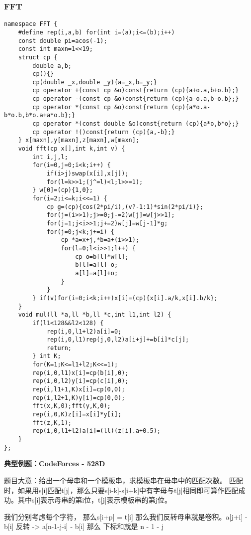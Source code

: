\subsubsection{FFT}
\begin{lstlisting}
namespace FFT {
    #define rep(i,a,b) for(int i=(a);i<=(b);i++)
    const double pi=acos(-1);
    const int maxn=1<<19;
    struct cp {
        double a,b;
        cp(){}
        cp(double _x,double _y){a=_x,b=_y;}
        cp operator +(const cp &o)const{return (cp){a+o.a,b+o.b};}
        cp operator -(const cp &o)const{return (cp){a-o.a,b-o.b};}
        cp operator *(const cp &o)const{return (cp){a*o.a-b*o.b,b*o.a+a*o.b};}
        cp operator *(const double &o)const{return (cp){a*o,b*o};}
        cp operator !()const{return (cp){a,-b};}
    } x[maxn],y[maxn],z[maxn],w[maxn];
    void fft(cp x[],int k,int v) {
        int i,j,l;
        for(i=0,j=0;i<k;i++) {
            if(i>j)swap(x[i],x[j]);
            for(l=k>>1;(j^=l)<l;l>>=1);
        } w[0]=(cp){1,0};
        for(i=2;i<=k;i<<=1) {
            cp g=(cp){cos(2*pi/i),(v?-1:1)*sin(2*pi/i)};
            for(j=(i>>1);j>=0;j-=2)w[j]=w[j>>1];
            for(j=1;j<i>>1;j+=2)w[j]=w[j-1]*g;
            for(j=0;j<k;j+=i) {
                cp *a=x+j,*b=a+(i>>1);
                for(l=0;l<i>>1;l++) {
                    cp o=b[l]*w[l];
                    b[l]=a[l]-o;
                    a[l]=a[l]+o;
                }
            }
        } if(v)for(i=0;i<k;i++)x[i]=(cp){x[i].a/k,x[i].b/k};
    }
    void mul(ll *a,ll *b,ll *c,int l1,int l2) {
        if(l1<128&&l2<128) {
            rep(i,0,l1+l2)a[i]=0;
            rep(i,0,l1)rep(j,0,l2)a[i+j]+=b[i]*c[j];
            return;
        } int K;
        for(K=1;K<=l1+l2;K<<=1);
        rep(i,0,l1)x[i]=cp(b[i],0);
        rep(i,0,l2)y[i]=cp(c[i],0);
        rep(i,l1+1,K)x[i]=cp(0,0);
        rep(i,l2+1,K)y[i]=cp(0,0);
        fft(x,K,0);fft(y,K,0);
        rep(i,0,K)z[i]=x[i]*y[i];
        fft(z,K,1);
        rep(i,0,l1+l2)a[i]=(ll)(z[i].a+0.5);
    }
};
\end{lstlisting}

{\bfseries 典型例题：CodeForces - 528D }

题目大意：给出一个母串和一个模板串，求模板串在母串中的匹配次数。 
匹配时，如果用s[i]匹配t[j]，那么只要s[i-k]-s[i+k]中有字母与t[j]相同即可算作匹配成功。其中s[i]表示母串的第i位，t[j]表示模板串的第j位。

我们分别考虑每个字符， 那么s[i+p] = t[i] 那么我们反转母串就是卷积。a[j+i] - b[i] 反转 -> a[n-1-j-i] - b[i] 那么 下标和就是 n - 1 - j

